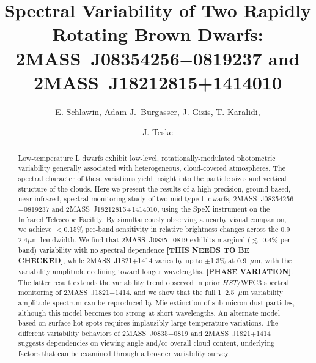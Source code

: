 \documentclass[twocolumn]{aastex6}
\begin{document}
\title{Spectral Variability of Two Rapidly Rotating Brown Dwarfs: \\2MASS~J08354256$-$0819237 and 2MASS~J18212815+1414010}


\author{E. Schlawin, Adam J.\ Burgasser, J. Gizis, T. Karalidi, \and J. Teske}


\begin{abstract}
Low-temperature L dwarfs exhibit low-level, rotationally-modulated photometric variability generally associated with heterogeneous, cloud-covered atmospheres. The spectral character of these variations yield insight into the particle sizes and vertical structure of the clouds. Here we present the results of a high precision, ground-based, near-infrared, spectral monitoring study of two mid-type L dwarfs, 2MASS~J08354256$-$0819237 and 2MASS~J18212815+1414010, using the SpeX instrument on the Infrared Telescope Facility. By simultaneously observing a nearby visual companion, we achieve $<$0.15\% per-band sensitivity in relative brightness changes across the 0.9--2.4$\mu$m bandwidth. We find that 2MASS~J0835$-$0819 exhibits marginal ($\lesssim$ 0.4\% per band) variability with no spectral dependence {\bf [THIS NEEDS TO BE CHECKED]}, while 2MASS~J1821+1414 varies by up to $\pm$1.3\% at 0.9~$\mu$m, with the variability amplitude declining toward longer wavelengths.  {\bf [PHASE VARIATION]}. The latter result extends the variability trend observed in prior $HST$/WFC3 spectral monitoring of 2MASS~J1821+1414, and we show that the full 1--2.5~$\mu$m variability amplitude spectrum can be reproduced by Mie extinction of sub-micron dust particles, although this model becomes too strong at short wavelengths. An alternate model based on surface hot spots requires implausibly large temperature variations. The different variability behaviors of 2MASS~J0835$-$0819 and  2MASS~J1821+1414 suggests dependencies on viewing angle and/or overall cloud content, underlying factors that can be examined through a broader variability survey.
\end{abstract}
\end{document}
